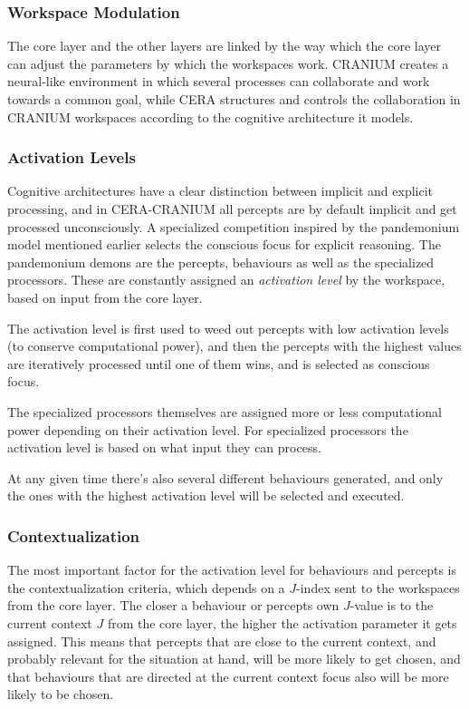 \subsubsection{Workspace Modulation}
The core layer and the other layers are linked by the way which the
core layer can adjust the parameters by which the workspaces work. CRANIUM
creates a neural-like environment in which several processes can collaborate
and work towards a common goal, while CERA structures and controls the
collaboration in CRANIUM workspaces according to the cognitive architecture it
models.

\subsubsection{Activation Levels}
Cognitive architectures have a clear distinction between implicit and explicit
processing\cite{atkinson2000consciousness}, and in CERA-CRANIUM all percepts
are by default implicit and get processed unconsciously. A specialized
competition inspired by the pandemonium model mentioned earlier selects the
conscious focus for explicit reasoning. The pandemonium demons are the
percepts, behaviours as well as the specialized processors. These are
constantly assigned an \textit{activation level} by the workspace, based on
input from the core layer.

The activation level is first used to weed out percepts with low activation
levels (to conserve computational power), and then the percepts with the highest
values are iteratively processed until one of them wins, and is selected as
conscious focus.

The specialized processors themselves are assigned more or less computational
power depending on their activation level. For specialized processors the
activation level is based on what input they can process.

At any given time there's also several different behaviours generated, and only
the ones with the highest activation level will be selected and executed.

\subsubsection{Contextualization}
The most important factor for the activation level for behaviours and percepts
is the contextualization criteria, which depends on a $J$-index sent to the
workspaces from the core layer. The closer a behaviour or percepts own $J$-value
is to the current context $J$ from the core layer, the higher the activation
parameter it gets assigned. This means that percepts that are close to the
current context, and probably relevant for the situation at hand, will be more
likely to get chosen, and that behaviours that are directed at the current
context focus also will be more likely to be chosen.

